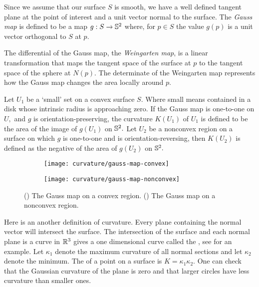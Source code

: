 Since we assume that our surface $S$ is smooth, we have a well defined
tangent plane at the point of interest and a unit vector normal to the surface.
The \emph{Gauss map} is defined to be a map $g:S\rightarrow \mathbb{S}^2$
where, for $p\in S$ the value $g(p)$ is a unit vector orthogonal to $S$ at $p.$

The differential of the Gauss map, the \emph{Weingarten map}, is a linear 
transformation that maps the tangent
space of the surface at $p$ to the tangent space of the sphere at $N(p)$.
The determinate of the Weingarten map represents how the Gauss map
changes the area locally around $p$. 

Let $U_1$ be a `small' set on a convex surface $S$. Where small means
contained in a disk whose intrinsic radius is approaching zero.
If the Gauss map is one-to-one on $U,$ and $g$ is orientation-preserving,
the curvature $K(U_1)$ of $U_1$ is defined to be the area of the image of $g(U_1)$
on $\mathbb{S}^2.$
Let $U_2$ be a nonconvex region on a surface on which $g$ is one-to-one and is orientation-reversing,
then $K(U_2)$ is defined as the negative of the area of $g(U_2)$ on $\mathbb{S}^2.$



\begin{figure}[htb]
    \captionsetup[subfigure]{justification=centering}
    \centering
    \begin{subfigure}[b]{0.3\textwidth}
        \texttt{[image: curvature/gauss-map-convex]}
       \subcaption{}\label{fig:gauss-map-convex}
    \end{subfigure}
        \hspace{1cm}
        \begin{subfigure}[b]{0.3\textwidth}
        \texttt{[image: curvature/gauss-map-nonconvex]}
        \subcaption{}\label{fig:gauss-map-nonconvex}
        \end{subfigure}
    \caption{() The Gauss map on a convex region.
        () The Gauss map on a nonconvex region.
    }
    \label{fig:normal-sections}
\end{figure}

Here is an another definition of curvature.
Every plane containing the normal vector will intersect the surface.
The intersection of the surface and each normal plane is a curve in $\mathbb{R}^3$
gives a one dimensional curve called the , see  
for an example.
Let $\kappa_1$ denote the maximum curvature of all normal sections 
and let $\kappa_2$ denote the minimum. 
The  of a point on a surface is
$K=\kappa_1\kappa_2.$
One can check that the Gaussian curvature of the plane is zero and
that larger circles have less curvature than smaller ones.



